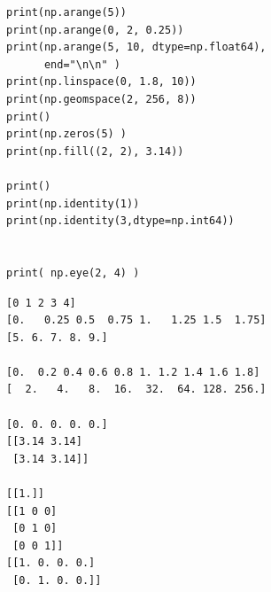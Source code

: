 
\begin{frame}[fragile]
%
\begin{tcbraster}[raster columns=2,
                  raster equal height,
                  nobeforeafter,
                  raster column skip=0.2cm]
\begin{codebox}
\begin{verbatim}
print(np.arange(5))
print(np.arange(0, 2, 0.25))
print(np.arange(5, 10, dtype=np.float64),
      end="\n\n" )
print(np.linspace(0, 1.8, 10))
print(np.geomspace(2, 256, 8))
print()
print(np.zeros(5) )
print(np.fill((2, 2), 3.14))

print()
print(np.identity(1))
print(np.identity(3,dtype=np.int64))


print( np.eye(2, 4) )

\end{verbatim}
\end{codebox}
%
\begin{cmdbox}
\begin{verbatim}
[0 1 2 3 4]
[0.   0.25 0.5  0.75 1.   1.25 1.5  1.75]
[5. 6. 7. 8. 9.]

[0.  0.2 0.4 0.6 0.8 1. 1.2 1.4 1.6 1.8]
[  2.   4.   8.  16.  32.  64. 128. 256.]

[0. 0. 0. 0. 0.]
[[3.14 3.14]
 [3.14 3.14]]

[[1.]]
[[1 0 0]
 [0 1 0]
 [0 0 1]]
[[1. 0. 0. 0.]
 [0. 1. 0. 0.]]
\end{verbatim}
\end{cmdbox}
\end{tcbraster}
%
\end{frame}


